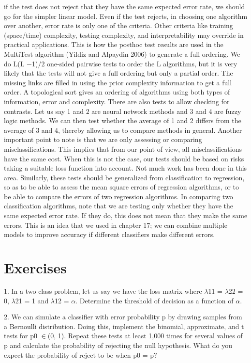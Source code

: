 if the test does not reject that they have the same expected error rate, we should go for the simpler linear model. Even if the test rejects, in choosing one algorithm over another, error rate is only one of the criteria. Other criteria like training (space/time) complexity, testing complexity, and interpretability may override in practical applications. This is how the posthoc test results are used in the MultiTest algorithm (Yildiz and Alpaydin 2006) to generate a full ordering. We do L(L $-$1)/2 one-sided pairwise tests to order the L algorithms, but it is very likely that the tests will not give a full ordering but only a partial order. The missing links are filled in using the prior complexity information to get a full order. A topological sort gives an ordering of algorithms using both types of information, error and complexity. There are also tests to allow checking for contrasts. Let us say 1 and 2 are neural network methods and 3 and 4 are fuzzy logic methods. We can then test whether the average of 1 and 2 differs from the average of 3 and 4, thereby allowing us to compare methods in general. Another important point to note is that we are only assessing or comparing misclassifications. This implies that from our point of view, all misclassifications have the same cost. When this is not the case, our tests should be based on risks taking a suitable loss function into account. Not much work has been done in this area. Similarly, these tests should be generalized from classification to regression, so as to be able to assess the mean square errors of regression algorithms, or to be able to compare the errors of two regression algorithms. In comparing two classification algorithms, note that we are testing only whether they have the same expected error rate. If they do, this does not mean that they make the same errors. This is an idea that we used in chapter 17; we can combine multiple models to improve accuracy if different classifiers make different errors.

\section{Exercises}

1. In a two-class problem, let us say we have the loss matrix where $\lambda$11 = $\lambda$22 = 0, $\lambda$21 = 1 and $\lambda$12 = $\alpha$. Determine the threshold of decision as a function of $\alpha$.

2. We can simulate a classifier with error probability p by drawing samples from a Bernoulli distribution. Doing this, implement the binomial, approximate, and t tests for p0 $\in$(0, 1). Repeat these tests at least 1,000 times for several values of p and calculate the probability of rejecting the null hypothesis. What do you expect the probability of reject to be when p0 = p?

